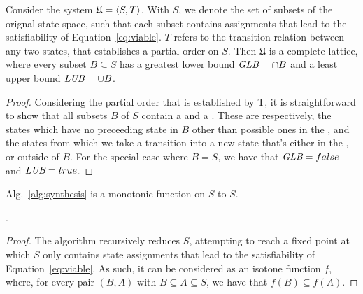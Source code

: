 \begin{lemma} Consider the system
$\mathfrak{U} = \langle S, T \rangle$. With $S$, we denote the set of
subsets of the orignal state space, such that each subset contains assignments that lead to the
satisfiability of Equation~\ref{eq:viable}. $T$ refers to the
transition relation between any two states, that establishes a partial order
on $S$. Then $\mathfrak{U}$ is a complete lattice, where every subset $B \subseteq
S$ has a greatest lower bound  $\textit {GLB} = \cap B$  and a least upper
bound $\textit {LUB} = \cup B$.
\label{lem:lattice}
\end{lemma}
\begin{proof}
Considering the partial order that is established by T, it is straightforward
to show that all subsets $B$ of $S$ contain a \glb and a \lub. These
are respectively, the states which have no preceeding state in $B$ other than
possible ones in the \glb, and the states from which we take a transition into
a new state that's either in the \lub, or outside of $B$. For the special case
where $B = S$, we have that $\textit {GLB} = false$ and $\textit {LUB} = true$.
\end{proof}



\begin{lemma} Alg.~\ref{alg:synthesis} is a monotonic function on $S$ to
$S$.

.
\label{lem:monotonicity}
\end{lemma}
\begin{proof}
The algorithm recursively reduces $S$, attempting to reach a fixed point
at which $S$ only contains state assignments that lead to the satisfiability of
Equation~\ref{eq:viable}. As such, it can be considered as an isotone function
$f$, where, for every pair $(B,A)$ with $B \subseteq A \subseteq S$, we have that
$f(B) \subseteq f(A)$.
\end{proof}

